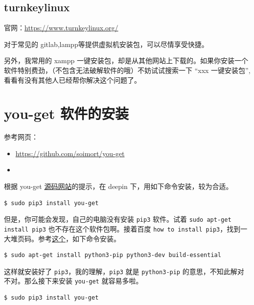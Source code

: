 \documentclass[doctor,openright,twoside]{sjtuthesis}
\newcommand{\passthrough}[1]{#1}
\theoremstyle{plain}
\theoremstyle{definition}
\theoremstyle{remark}
\theoremstyle{ocrenumbox}
\theoremstyle{plain}
\begin{document}
\hypertarget{turnkeylinux}{%
\subsection{turnkeylinux}\label{turnkeylinux}}

官网：\url{https://www.turnkeylinux.org/}

对于常见的 gitlab,lampp等提供虚拟机安装包，可以尽情享受快捷。

另外，我常用的 xampp
一键安装包，却是从其他网站上下载的。如果你安装一个软件特别费劲，（不包含无法破解软件的哦）不妨试试搜索一下
``xxx 一键安装包'',看看有没有其他人已经帮你解决这个问题了。

\hypertarget{you-get-}{%
\section{you-get 软件的安装}\label{you-get-}}

参考网页：

\begin{itemize}
\item
  \url{https://github.com/soimort/you-get}
\item
\end{itemize}

根据 you-get
\href{https://github.com/soimort/you-get}{源码网站}的提示，在 deepin
下，用如下命令安装，较为合适。

\begin{lstlisting}[language=bash]
$ sudo pip3 install you-get
\end{lstlisting}

但是，你可能会发现，自己的电脑没有安装 \passthrough{\lstinline!pip3!}
软件。试着 \passthrough{\lstinline!sudo apt-get install pip3!}
也不存在这个软件包啊。接着百度
\passthrough{\lstinline!how to install pip3!}，找到一大堆页码。参考\href{http://ask.xmodulo.com/install-pip-linux.html}{这个}，如下命令安装。

\begin{lstlisting}[language=bash]
$ sudo apt-get install python3-pip python3-dev build-essential
\end{lstlisting}

这样就安装好了
\passthrough{\lstinline!pip3!}，我的理解，\passthrough{\lstinline!pip3!}
就是 \passthrough{\lstinline!python3-pip!}
的意思，不知此解对不对。那么接下来安装 \passthrough{\lstinline!you-get!}
就容易多啦。

\begin{lstlisting}[language=bash]
$ sudo pip3 install you-get
\end{lstlisting}
\end{document}
